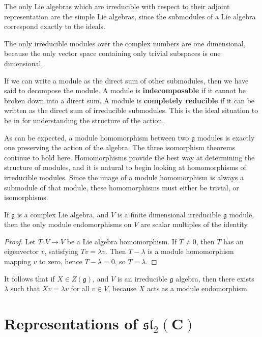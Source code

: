 \begin{example}
    The only Lie algebras which are irreducible with respect to their adjoint representation are the simple Lie algebras, since the submodules of a Lie algebra correspond exactly to the ideals.
\end{example}

\begin{example}
    The only irreducible modules over the complex numbers are one dimensional, because the only vector space containing only trivial subspaces is one dimensional.
\end{example}

If we can write a module as the direct sum of other submodules, then we have said to decompose the module. A module is {\bf indecomposable} if it cannot be broken down into a direct sum. A module is {\bf completely reducible} if it can be written as the direct sum of irreducible submodules. This is the ideal situation to be in for understanding the structure of the action.

As can be expected, a module homomorphism between two $\mathfrak{g}$ modules is exactly one preserving the action of the algebra. The three isomorphism theorems continue to hold here. Homomorphisms provide the best way at determining the structure of modules, and it is natural to begin looking at homomorphisms of irreducible modules. Since the image of a module homomorphism is always a submodule of that module, these homomorphisms must either be trivial, or isomorphisms.

\begin{lemma}[Schur]
    If $\mathfrak{g}$ is a complex Lie algebra, and $V$ is a finite dimensional irreducible $\mathfrak{g}$ module, then the only module endomorphisms on $V$ are scalar multiples of the identity.
\end{lemma}
\begin{proof}
    Let $T: V \to V$ be a Lie algebra homomorphism. If $T \neq 0$, then $T$ has an eigenvector $v$, satisfying $Tv = \lambda v$. Then $T - \lambda$ is a module homomorphism mapping $v$ to zero, hence $T - \lambda = 0$, so $T = \lambda$.
\end{proof}

It follows that if $X \in Z(\mathfrak{g})$, and $V$ is an irreducible $\mathfrak{g}$ algebra, then there exists $\lambda$ such that $Xv = \lambda v$ for all $v \in V$, because $X$ acts as a module endomorphism.




\section{Representations of $\mathfrak{sl}_2(\mathbf{C})$}

